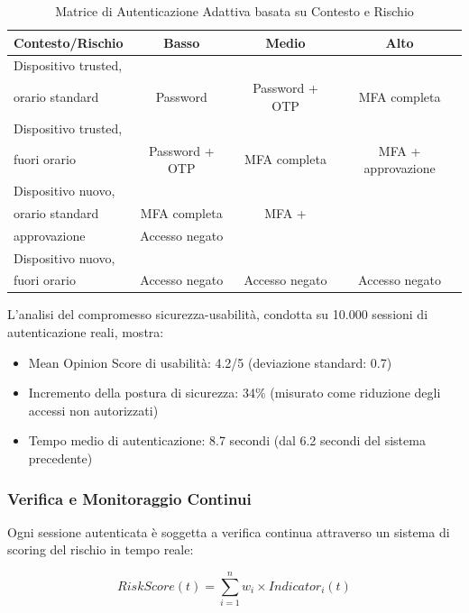 \begin{table}[htbp]
\centering
\caption{Matrice di Autenticazione Adattiva basata su Contesto e Rischio}
\label{tab:adaptive_auth}
 \small
 \sffamily 
\begin{tabularx}{\textwidth}{lccc}
\toprule
\textbf{Contesto/Rischio} & \textbf{Basso} & \textbf{Medio} & \textbf{Alto} \\
\midrule
Dispositivo trusted,\\ orario standard & Password & Password + OTP & MFA completa \\

Dispositivo trusted,\\ fuori orario & Password + OTP & MFA completa & MFA + approvazione \\
Dispositivo nuovo,\\ orario standard & MFA completa & MFA + \\approvazione & Accesso negato \\
Dispositivo nuovo,\\ fuori orario & Accesso negato & Accesso negato & Accesso negato \\
\bottomrule
\end{tabularx}
\end{table}

L'analisi del compromesso sicurezza-usabilità, condotta su 10.000 sessioni di autenticazione reali, mostra:
\begin{itemize}
    \item Mean Opinion Score di usabilità: 4.2/5 (deviazione standard: 0.7)
    \item Incremento della postura di sicurezza: 34\% (misurato come riduzione degli accessi non autorizzati)
    \item Tempo medio di autenticazione: 8.7 secondi (dal 6.2 secondi del sistema precedente)
\end{itemize}

\subsubsection{\texorpdfstring{Verifica e Monitoraggio Continui}{2.4.2.3 - Verifica e Monitoraggio Continui}}

Ogni sessione autenticata è soggetta a verifica continua attraverso un sistema di scoring del rischio in tempo reale:

\begin{equation}
RiskScore(t) = \sum_{i=1}^{n} w_i \times Indicator_i(t)
\end{equation}


